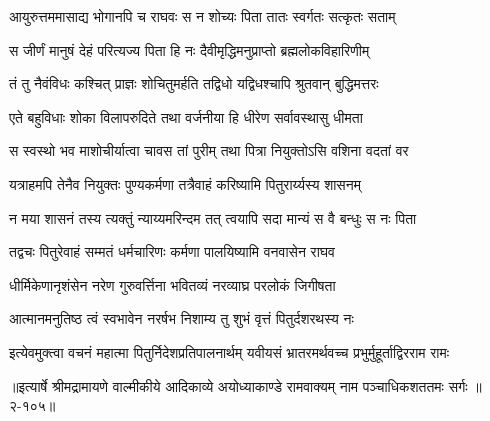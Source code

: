 \twolineshloka
{आयुरुत्तममासाद्य भोगानपि च राघवः}
{स न शोच्यः पिता तातः स्वर्गतः सत्कृतः सताम्} %

\twolineshloka
{स जीर्णं मानुषं देहं परित्यज्य पिता हि नः}
{दैवीमृद्धिमनुप्राप्तो ब्रह्मलोकविहारिणीम्} %

\twolineshloka
{तं तु नैवंविधः कश्चित् प्राज्ञः शोचितुमर्हति}
{तद्विधो यद्विधश्चापि श्रुतवान् बुद्धिमत्तरः} %

\twolineshloka
{एते बहुविधाः शोका विलापरुदिते तथा}
{वर्जनीया हि धीरेण सर्वावस्थासु धीमता} %

\twolineshloka
{स स्वस्थो भव माशोचीर्यात्वा चावस तां पुरीम्}
{तथा पित्रा नियुक्तोऽसि वशिना वदतां वर} %

\twolineshloka
{यत्राहमपि तेनैव नियुक्तः पुण्यकर्मणा}
{तत्रैवाहं करिष्यामि पितुरार्य्यस्य शासनम्} %

\twolineshloka
{न मया शासनं तस्य त्यक्तुं न्याय्यमरिन्दम}
{तत् त्वयापि सदा मान्यं स वै बन्धुः स नः पिता} %

\twolineshloka
{तद्वचः पितुरेवाहं सम्मतं धर्मचारिणः}
{कर्मणा पालयिष्यामि वनवासेन राघव} %

\twolineshloka
{धीर्मिकेणानृशंसेन नरेण गुरुवर्त्तिना}
{भवितव्यं नरव्याघ्र परलोकं जिगीषता} %

\twolineshloka
{आत्मानमनुतिष्ठ त्वं स्वभावेन नरर्षभ}
{निशाम्य तु शुभं वृत्तं पितुर्दशरथस्य नः} %

\twolineshloka
{इत्येवमुक्त्वा वचनं महात्मा पितुर्निदेशप्रतिपालनार्थम्}
{यवीयसं भ्रातरमर्थवच्च प्रभुर्मुहूर्ताद्विरराम रामः} %


॥इत्यार्षे श्रीमद्रामायणे वाल्मीकीये आदिकाव्ये अयोध्याकाण्डे रामवाक्यम् नाम पञ्चाधिकशततमः सर्गः ॥२-१०५॥
